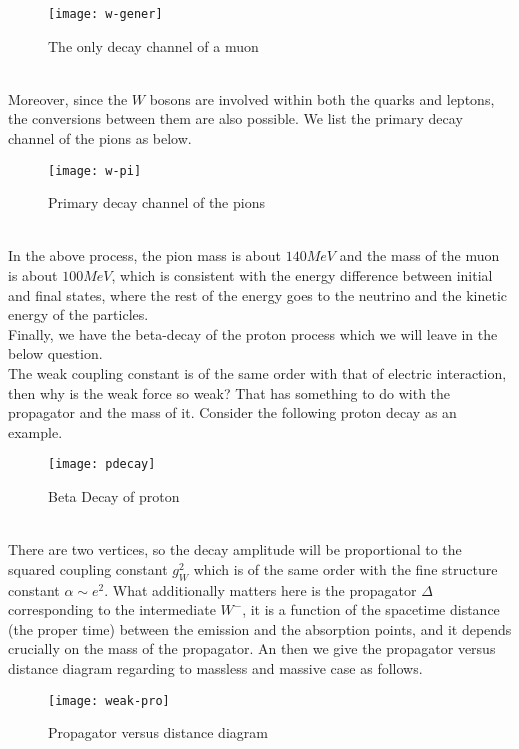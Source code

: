 \documentclass{article}
\renewcommand{\1}{\left}
\renewcommand{\2}{\right}
\newcommand{\al}{\alpha}
\begin{document}
\begin{figure}[h]
\centering
\texttt{[image: w-gener]}
\caption{The only decay channel of a muon}
\end{figure}\\
Moreover, since the $W$ bosons are involved within both the quarks and leptons, the conversions between them are also possible. We list the primary decay channel of the pions as below.
\begin{figure}[h]
\centering
\texttt{[image: w-pi]}
\caption{Primary decay channel of the pions}
\end{figure}\\
In the above process, the pion mass is about $140MeV$ and the mass of the muon is about $100MeV$, which is consistent with the energy difference between initial and final states, where the rest of the energy goes to the neutrino and the kinetic energy of the particles.\\
Finally, we have the beta-decay of the proton process which we will leave in the below question.\\

The weak coupling constant is of the same order with that of electric interaction, then why is the weak force so weak? That has something to do with the propagator and  the mass of it. Consider the following proton decay as an example.
\begin{figure}[h]
\centering
\texttt{[image: pdecay]}
\caption{Beta Decay of proton}
\end{figure}\\

There are two vertices, so the decay amplitude will be proportional to the squared coupling constant $g_W^2$ which is of the same order with the fine structure constant $\al\sim e^2$. What additionally matters here is the propagator $\Delta$ corresponding to the intermediate $W^-$, it is a function of the spacetime distance (the proper time) between the emission and the absorption points, and it depends crucially on  the mass of the propagator. An then we give the propagator versus distance diagram regarding to massless and massive case as follows.
\begin{figure}[h]
\centering
\texttt{[image: weak-pro]}
\caption{Propagator versus distance diagram}
\end{figure}\\ 
\end{document}
